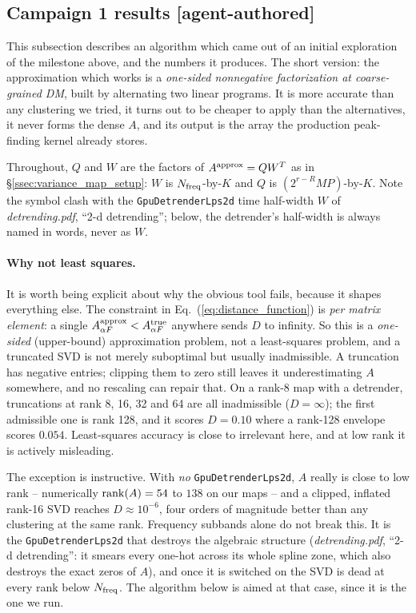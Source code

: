 \documentclass{article}
\numberwithin{equation}{section}   %
\newcommand{\dtnotes}[1]{{\em detrending.pdf}, ``#1''}
\begin{document}
\subsection{Campaign 1 results [agent-authored]}
\label{ssec:varmap_proposed}

This subsection describes an algorithm which came out of an initial exploration of the
milestone above, and the numbers it produces. The short version: the approximation which works is
a {\em one-sided nonnegative factorization at coarse-grained DM}, built by alternating two
linear programs. It is more accurate than any clustering we tried, it turns out to be cheaper to
apply than the alternatives, it never forms the dense $A$, and its output is the array the
production peak-finding kernel already stores.

Throughout, $Q$ and $W$ are the factors of $A^{\rm approx} = QW^T$ as in
\S\ref{ssec:variance_map_setup}: $W$ is $N_{\rm freq}$-by-$K$ and $Q$ is $(2^{r-R}MP)$-by-$K$.
Note the symbol clash with the {\tt GpuDetrenderLps2d} time half-width $W$ of \dtnotes{2-d detrending};
below, the detrender's half-width is always named in words, never as $W$.

\paragraph*{Why not least squares.}
It is worth being explicit about why the obvious tool fails, because it shapes everything else.
The constraint in Eq.\ (\ref{eq:distance_function}) is {\em per matrix element}: a single
$A^{\rm approx}_{\alpha F} < A^{\rm true}_{\alpha F}$ anywhere sends $D$ to infinity. So this is
a {\em one-sided} (upper-bound) approximation problem, not a least-squares problem, and a
truncated SVD is not merely suboptimal but usually inadmissible. A truncation has negative
entries; clipping them to zero still leaves it underestimating $A$ somewhere, and no rescaling
can repair that. On a rank-8 map with a detrender, truncations at rank 8, 16, 32 and 64 are all
inadmissible ($D = \infty$); the first admissible one is rank 128, and it scores $D = 0.10$
where a rank-128 envelope scores $0.054$. Least-squares accuracy is close to irrelevant here,
and at low rank it is actively misleading.

The exception is instructive. With {\em no} {\tt GpuDetrenderLps2d}, $A$ really is close to low rank
-- numerically ${\rm rank}(A) = 54$ to $138$ on our maps -- and a clipped, inflated rank-16 SVD
reaches $D \approx 10^{-6}$, four orders of magnitude better than any clustering at the same
rank. Frequency subbands alone do not break this. It is the {\tt GpuDetrenderLps2d} that destroys the
algebraic structure (\dtnotes{2-d detrending}: it smears every one-hot across its whole spline
zone, which also destroys the exact zeros of $A$), and once it is switched on the SVD is dead at
every rank below $N_{\rm freq}$. The algorithm below is aimed at that case, since it is the one
we run.
\end{document}
